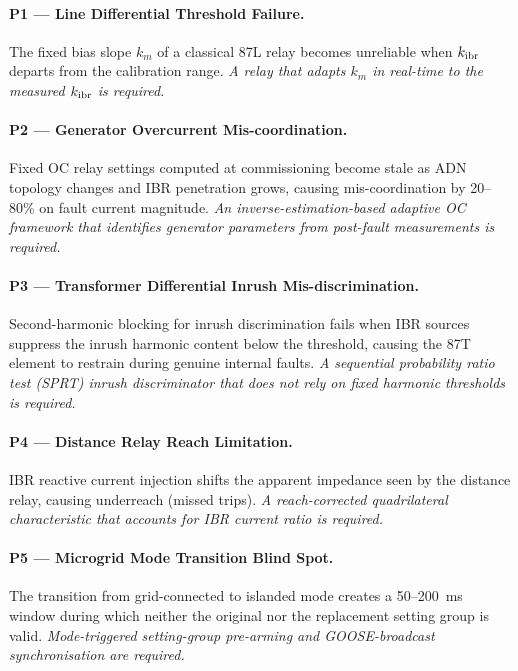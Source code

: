 \paragraph{P1 --- Line Differential Threshold Failure.}
The fixed bias slope $k_m$ of a classical 87L relay becomes unreliable when
$k_\mathrm{ibr}$ departs from the calibration range. \emph{A relay that adapts $k_m$
in real-time to the measured $k_\mathrm{ibr}$ is required.}

\paragraph{P2 --- Generator Overcurrent Mis-coordination.}
Fixed OC relay settings computed at commissioning become stale as ADN topology
changes and IBR penetration grows, causing mis-coordination by 20--80\% on
fault current magnitude. \emph{An inverse-estimation-based adaptive OC framework
that identifies generator parameters from post-fault measurements is required.}

\paragraph{P3 --- Transformer Differential Inrush Mis-discrimination.}
Second-harmonic blocking for inrush discrimination fails when IBR sources
suppress the inrush harmonic content below the threshold, causing the 87T
element to restrain during genuine internal faults.
\emph{A sequential probability ratio test (SPRT) inrush discriminator that
does not rely on fixed harmonic thresholds is required.}

\paragraph{P4 --- Distance Relay Reach Limitation.}
IBR reactive current injection shifts the apparent impedance seen by the
distance relay, causing underreach (missed trips). \emph{A reach-corrected
quadrilateral characteristic that accounts for IBR current ratio is required.}

\paragraph{P5 --- Microgrid Mode Transition Blind Spot.}
The transition from grid-connected to islanded mode creates a 50--200~ms
window during which neither the original nor the replacement setting group
is valid. \emph{Mode-triggered setting-group pre-arming and GOOSE-broadcast
synchronisation are required.}

